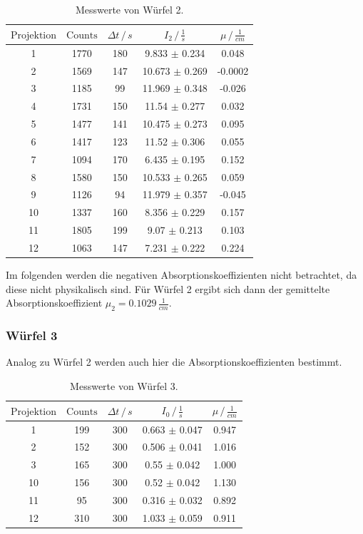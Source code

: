 \begin{table}
  \centering
  \label{tab:w2}
  \begin{tabular}{c c c c c}
  \toprule
  $\text{Projektion}$ & $\text{Counts}$ & $\Delta t \,/\, s $ & $I_2 \,/\, \frac{1}{s} $ & $\mu \,/\, \frac{1}{cm}$\\
  \midrule 
 1 & 1770 & 180 & 9.833 $\pm$ 0.234  & 0.048 \\
 2 & 1569 & 147 & 10.673 $\pm$ 0.269 & -0.0002 \\
 3 & 1185 & 99 & 11.969 $\pm$ 0.348  & -0.026 \\
 4 & 1731 & 150 & 11.54 $\pm$ 0.277  & 0.032 \\
 5 & 1477 & 141 & 10.475 $\pm$ 0.273 & 0.095 \\
 6 & 1417 & 123 & 11.52 $\pm$ 0.306  & 0.055 \\
 7 & 1094 & 170 & 6.435 $\pm$ 0.195  & 0.152 \\
 8 & 1580 & 150 & 10.533 $\pm$ 0.265 & 0.059 \\
 9 & 1126 & 94 & 11.979 $\pm$ 0.357  & -0.045 \\
10 & 1337 & 160 & 8.356 $\pm$ 0.229  & 0.157 \\
11 & 1805 & 199 & 9.07 $\pm$ 0.213   &  0.103 \\
12 & 1063 & 147 & 7.231 $\pm$ 0.222  & 0.224 \\
\bottomrule
\end{tabular}
\label{tab:w2}
\caption{Messwerte von Würfel 2.}
\end{table}

\noindent
Im folgenden werden die negativen Absorptionskoeffizienten nicht betrachtet, da diese nicht physikalisch sind.
Für Würfel 2 ergibt sich dann der gemittelte Absorptionskoeffizient $\mu_2 = 0.1029 \, \frac{1}{cm}$.

  
  
\subsubsection{Würfel 3}

\noindent
Analog zu Würfel 2 werden auch hier die Absorptionskoeffizienten bestimmt.

\begin{table}
\centering
{}
\begin{tabular}{c c c c c}
\toprule
$\text{Projektion}$ & $\text{Counts}$ & $\Delta t \,/\, s $ & $I_0 \,/\, \frac{1}{s} $ & $\mu \,/\, \frac{1}{cm} $\\
 \midrule 
 1 & 199  & 300 & 0.663 $\pm$ 0.047 & 0.947  \\
 2 & 152  & 300 & 0.506 $\pm$ 0.041 & 1.016  \\
 3 & 165  & 300 & 0.55 $\pm$ 0.042  & 1.000 \\
 10 & 156 & 300& 0.52 $\pm$  0.042  & 1.130 \\
 11 & 95  & 300& 0.316 $\pm$ 0.032  & 0.892 \\
 12 & 310 & 300& 1.033 $\pm$ 0.059  & 0.911 \\
\bottomrule
\end{tabular}
\label{tab:w3}
\caption{Messwerte von Würfel 3.}
\end{table}

